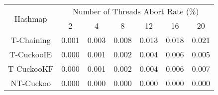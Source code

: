 \begin{tabular}{|c|c|c|c|c|c|c|}
\hline
\multirow{2}{*}{Hashmap} & \multicolumn{6}{c|}{Number of Threads Abort Rate (\%)}\\\cline{2-7}& 2 & 4 & 8 & 12 & 16 & 20\\
\hline
\hline
T-Chaining & 0.001 & 0.003 & 0.008 & 0.013 & 0.018 & 0.021\\
T-CuckooIE & 0.000 & 0.001 & 0.002 & 0.004 & 0.006 & 0.005\\
T-CuckooKF & 0.000 & 0.001 & 0.002 & 0.004 & 0.006 & 0.007\\
NT-Cuckoo & 0.000 & 0.000 & 0.000 & 0.000 & 0.000 & 0.000\\
\hline
\end{tabular}

